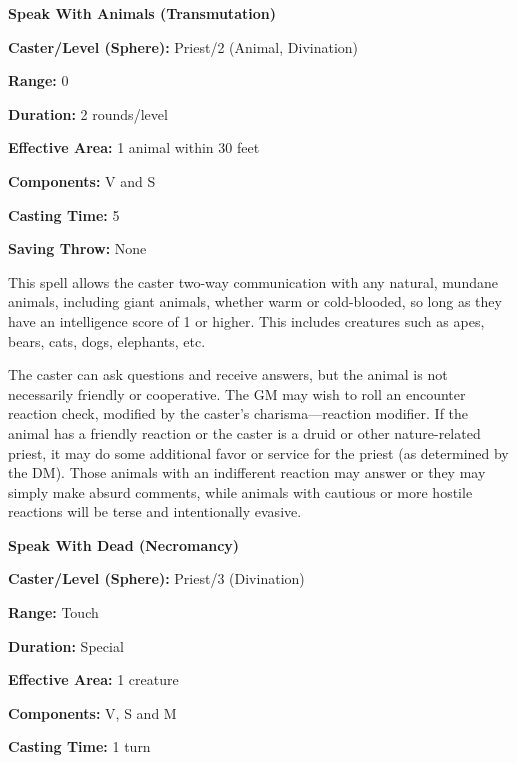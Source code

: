 \begin{multicols}{2}
\noindent
\begin{minipage}{\columnwidth}

\noindent \textbf{Speak With Animals (Transmutation)}

\noindent \textbf{Caster/Level (Sphere):} Priest/2 (Animal, Divination)

\noindent \textbf{Range:} 0

\noindent \textbf{Duration:} 2 rounds/level

\noindent \textbf{Effective Area:} 1 animal within 30 feet

\noindent \textbf{Components:} V and S

\noindent \textbf{Casting Time:} 5

\noindent \textbf{Saving Throw:} None

\end{minipage}

This spell allows the caster two-way communication with any natural, mundane animals, including giant animals, whether warm or cold-blooded, so long as they have an intelligence score of 1 or higher.  This includes creatures such as apes, bears, cats, dogs, elephants, etc.

The caster can ask questions and receive answers, but the animal is not necessarily friendly or cooperative.  The GM may wish to roll an encounter reaction check, modified by the caster's charisma---reaction modifier.  If the animal has a friendly reaction or the caster is a druid or other nature-related priest, it may do some additional favor or service for the priest (as determined by the DM).  Those animals with an indifferent reaction may answer or they may simply make absurd comments, while animals with cautious or more hostile reactions will be terse and intentionally evasive. 

\vspace{1em}

\noindent
\begin{minipage}{\columnwidth}

\noindent \textbf{Speak With Dead (Necromancy)}

\noindent \textbf{Caster/Level (Sphere):} Priest/3 (Divination)

\noindent \textbf{Range:} Touch

\noindent \textbf{Duration:} Special

\noindent \textbf{Effective Area:} 1 creature

\noindent \textbf{Components:} V, S and M

\noindent \textbf{Casting Time:} 1 turn


\end{minipage}
\end{multicols}

